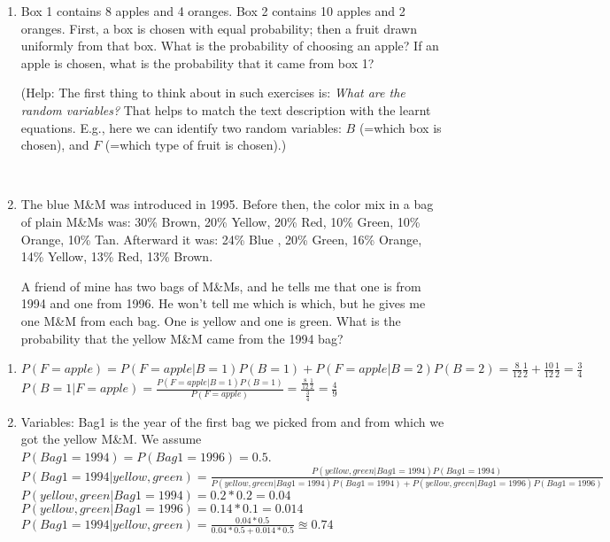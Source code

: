 \begin{enumerate}
\item Box 1 contains 8 apples and 4 oranges. Box 2 contains 10 apples and 2
oranges. First, a box is chosen with equal probability; then a fruit drawn uniformly from that box. What is the
probability of choosing an apple? If an apple is chosen, what is the
probability that it came from box 1?

{\small (Help: The first thing to think about in such exercises is: \emph{What are the random variables?} That helps to match the text description with the learnt equations. E.g., here we can identify two random variables: $B$ (=which box is chosen), and $F$ (=which type of fruit is chosen).)

}

~

\item The blue M\&M was introduced in 1995.
Before then, the color mix in a bag of plain M\&Ms was:
30\% Brown, 20\% Yellow, 20\% Red, 10\% Green, 10\% Orange, 10\% Tan.
Afterward it was: 24\% Blue , 20\% Green, 16\% Orange, 14\% Yellow, 13\% Red,
13\% Brown.

A friend of mine has two bags of M\&Ms, and he tells me that one is from
1994 and one from 1996.  He won't tell me which is which, but he gives me
one M\&M from each bag.  One is yellow and one is green.  What is the
probability that the yellow M\&M came from the 1994 bag?
\end{enumerate}

\begin{solution}
\begin{enumerate}
\item $P(F=apple) = P(F=apple|B=1) P(B=1) + P(F=apple|B=2)P(B=2) = \frac{8}{12} \frac{1}{2} + \frac{10}{12} \frac{1}{2} = \frac{3}{4} $ \\
$P(B=1|F=apple) =  \frac{P(F=apple|B=1)P(B=1)}{P(F=apple)} =  \frac{\frac{8}{12} \frac{1}{2}}{\frac{3}{4}} = \frac{4}{9} $

\item
Variables: Bag1 is the year of the first bag we picked from and from which we got the yellow M\&M. We assume $P(Bag1=1994) = P(Bag1=1996)=0.5$.\\
$P(Bag1=1994 | yellow, green ) = \frac{P(yellow, green | Bag1=1994) P(Bag1=1994) }{P(yellow, green | Bag1=1994) P(Bag1=1994) + P(yellow, green | Bag1=1996) P(Bag1=1996) } $\\
$P(yellow, green | Bag1=1994) = 0.2 * 0.2 = 0.04$\\
$P(yellow, green | Bag1=1996) = 0.14 * 0.1 = 0.014$\\
$P(Bag1=1994 | yellow, green ) =  \frac{0.04 * 0.5}{0.04 * 0.5 + 0.014 * 0.5} \approxeq 0.74$
\end{enumerate}
\end{solution}

